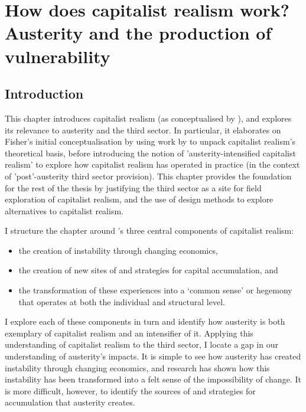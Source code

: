 \chapter{How does capitalist realism work? Austerity and the production of vulnerability}
 \label{2}


\section{Introduction}
\label{2-intro}

This chapter introduces capitalist realism (as conceptualised by \citet{fisher_capitalist_2009}), and explores its relevance to austerity and the third sector. In particular, it elaborates on Fisher's initial conceptualisation by using work by \citet{shonkwiler_reading_2014} to unpack capitalist realism's theoretical basis, before introducing the notion of 'austerity-intensified capitalist realism' to explore how capitalist realism has operated in practice (in the context of 'post'-austerity third sector provision). This chapter provides the foundation for the rest of the thesis by justifying the third sector as a site for field exploration of capitalist realism, and the use of design methods to explore alternatives to capitalist realism. 

I structure the chapter around \citet{shonkwiler_reading_2014}'s three central components of capitalist realism:

\begin{itemize}
    \item         the creation of instability through changing economics, 
    \item the creation of new sites of and strategies for capital accumulation, and 
    \item the transformation of these experiences into a `common sense' or hegemony that operates at both the individual and structural level. 
\end{itemize}

I explore each of these components in turn and identify how austerity is both exemplary of capitalist realism and an intensifier of it. Applying this understanding of capitalist realism to the third sector, I locate a gap in our understanding of austerity's impacts. It is simple to see how austerity has created instability through changing economics, and research has shown how this instability has been transformed into a felt sense of the impossibility of change. It is more difficult, however, to identify the sources of and strategies for accumulation that austerity creates. 

